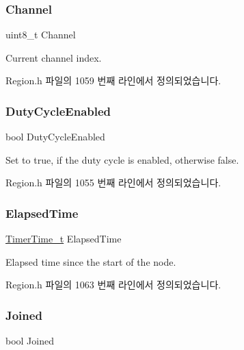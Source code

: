 \subsubsection{\texorpdfstring{Channel}{Channel}}
{\footnotesize\ttfamily uint8\+\_\+t Channel}

Current channel index. 

Region.\+h 파일의 1059 번째 라인에서 정의되었습니다.

\mbox{\label{structs_calc_back_off_params_a4d755868e0e80089462286c3ba6a6f18}} 
\subsubsection{\texorpdfstring{Duty\+Cycle\+Enabled}{DutyCycleEnabled}}
{\footnotesize\ttfamily bool Duty\+Cycle\+Enabled}

Set to true, if the duty cycle is enabled, otherwise false. 

Region.\+h 파일의 1055 번째 라인에서 정의되었습니다.

\mbox{\label{structs_calc_back_off_params_a2ece30988e7a5bac284623173173c71a}} 
\subsubsection{\texorpdfstring{Elapsed\+Time}{ElapsedTime}}
{\footnotesize\ttfamily \mbox{\hyperlink{utilities_8h_a4215ca43d3e953099ea758ce428599d0}{Timer\+Time\+\_\+t}} Elapsed\+Time}

Elapsed time since the start of the node. 

Region.\+h 파일의 1063 번째 라인에서 정의되었습니다.

\mbox{\label{structs_calc_back_off_params_ac2f6caa0f3b02d2ac5056c3ee7c22652}} 
\subsubsection{\texorpdfstring{Joined}{Joined}}
{\footnotesize\ttfamily bool Joined}

